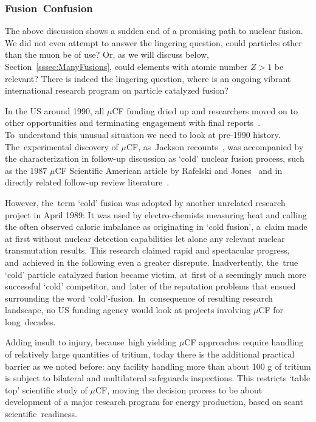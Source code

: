 \documentclass[particles,article,accept,pdftex,moreauthors]{Definitions/mdpi}
\begin{document}
\subsubsection{Fusion~Confusion}\label{ssec:conCF}
The above discussion shows a sudden end of a promising path to nuclear fusion. We did not even attempt to answer the lingering question, could particles other than the muon be of use? Or, as we will discuss below, Section~\ref{sssec:ManyFusions}, could elements with atomic number $Z>1$ be relevant? There is indeed the lingering question, where is an ongoing vibrant international research program on particle catalyzed fusion? 

In the US around 1990, all $\mu$CF funding dried up and researchers moved on to other opportunities and terminating engagement with final reports~\cite{Rafelski:1991DOE}. To~understand this unusual situation we need to look at pre-1990 history. The~experimental discovery of $\mu$CF, as~Jackson recounts~\cite{Jackson:2010Rem}, was accompanied by the characterization in follow-up discussion as `cold' nuclear fusion process, such as the 1987 $\mu$CF Scientific American article by Rafelski and Jones~\cite{Rafelski:1987Jones} and in directly related follow-up review literature~\cite{Rafelski:1990gg}.

However, the~term `cold' fusion was adopted by another unrelated research project in April 1989: It was used by electro-chemists measuring heat and calling the often observed caloric imbalance as originating in `cold fusion', a~claim made at first without nuclear detection capabilities let alone any relevant nuclear transmutation results. This research claimed rapid and spectacular progress, and~achieved in the following even a greater disrepute. Inadvertently, the~true `cold' particle catalyzed fusion became victim, at~first of a seemingly much more successful `cold' competitor, and~later of the reputation problems that ensued surrounding the word `cold'-fusion. In~consequence of resulting research landscape, no US funding agency would look at projects involving $\mu$CF for long~decades.

Adding insult to injury, because~high yielding $\mu$CF approaches require handling of relatively large quantities of tritium, today there is the additional practical barrier as we noted before: any facility handling more than about 100 g of tritium is subject to bilateral and multilateral safeguards inspections. This restricts `table top' scientific study of $\mu$CF, moving the decision process to be about development of a major research program for energy production, based on scant scientific~readiness.
\end{document}

